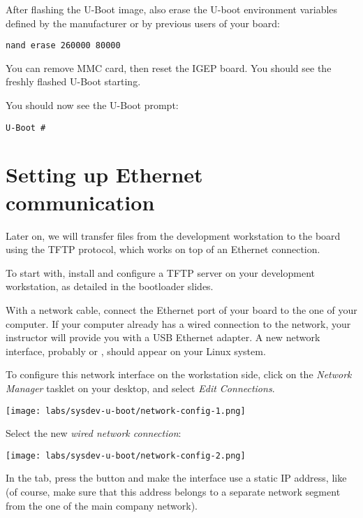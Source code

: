 After flashing the U-Boot image, also erase the U-boot environment
variables defined by the manufacturer or by previous users of your
board:

\begin{verbatim}
nand erase 260000 80000
\end{verbatim}

You can remove MMC card, then reset the IGEP board. You should see the
freshly flashed U-Boot starting.

You should now see the U-Boot prompt:

\begin{verbatim}
U-Boot #
\end{verbatim}

\clearpage

\section{Setting up Ethernet communication}

Later on, we will transfer files from the development workstation to
the board using the TFTP protocol, which works on top of an Ethernet
connection.

To start with, install and configure a TFTP server on your development
workstation, as detailed in the bootloader slides.

With a network cable, connect the Ethernet port of your board to the
one of your computer. If your computer already has a wired connection
to the network, your instructor will provide you with a USB Ethernet
adapter. A new network interface, probably  or ,
should appear on your Linux system.

To configure this network interface on the workstation side, click on
the {\em Network Manager} tasklet on your desktop, and select {\em
  Edit Connections}.

\begin{center}
\texttt{[image: labs/sysdev-u-boot/network-config-1.png]}
\end{center}

Select the new {\em wired network connection}:

\begin{center}
\texttt{[image: labs/sysdev-u-boot/network-config-2.png]}
\end{center}

In the  tab, press the  button
and make the interface use a static IP
address, like  (of course, make sure that this
address belongs to a separate network segment from the one of the main
company network).

